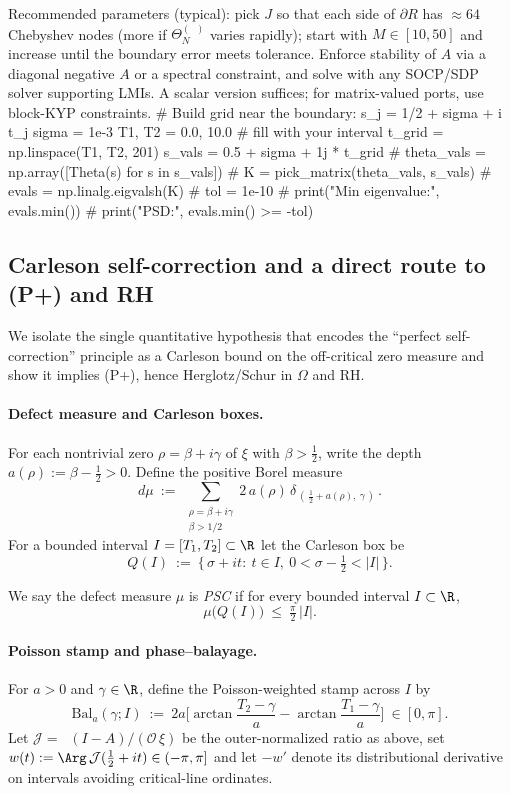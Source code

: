 \documentclass[11pt]{article}
\theoremstyle{remark}
\DeclareMathOperator{\dettwo}{det_2}
\begin{document}
Recommended parameters (typical): pick \(J\) so that each side of \(\partial R\) has \(\approx 64\) Chebyshev nodes (more if \(\Theta_N^{(\dettwo)}\) varies rapidly); start with \(M\in[10,50]\) and increase until the boundary error meets tolerance. Enforce stability of \(A\) via a diagonal negative \(A\) or a spectral constraint, and solve with any SOCP/SDP solver supporting LMIs. A scalar version suffices; for matrix-valued ports, use block-KYP constraints.
# Build grid near the boundary: s_j = 1/2 + sigma + i t_j
sigma = 1e-3
T1, T2 = 0.0, 10.0  # fill with your interval
t_grid = np.linspace(T1, T2, 201)
s_vals = 0.5 + sigma + 1j * t_grid
# theta_vals = np.array([Theta(s) for s in s_vals])
# K = pick_matrix(theta_vals, s_vals)
# evals = np.linalg.eigvalsh(K)
# tol = 1e-10
# print("Min eigenvalue:", evals.min())
# print("PSD:", evals.min() >= -tol)

\subsection{Carleson self-correction and a direct route to (P+) and RH}\label{subsec:PSC}
We isolate the single quantitative hypothesis that encodes the ``perfect self-correction'' principle as a Carleson bound on the off-critical zero measure and show it implies (P+), hence Herglotz/Schur in \(\Omega\) and RH.

\paragraph{Defect measure and Carleson boxes.}
For each nontrivial zero \(\rho=\beta+i\gamma\) of \(\xi\) with \(\beta>\tfrac12\), write the depth \(a(\rho):=\beta-\tfrac12>0\). Define the positive Borel measure
\[
 d\mu\ :=\ \sum_{\substack{\rho=\beta+i\gamma\\ \beta>1/2}} 2\,a(\rho)\,\delta_{\,(\,\tfrac12+a(\rho),\ \gamma\,)}\,.
\]
For a bounded interval \(I=[T_1,T_2]\subset\R\) let the Carleson box be
\[
 Q(I)\ :=\ \{\,\sigma+it:\ t\in I,\ 0<\sigma-\tfrac12<|I|\,\}.
\]

\begin{definition}\label{def:PSC}
We say the defect measure \(\mu\) is \emph{PSC} if for every bounded interval \(I\subset\R\),
\[
 \mu\big(Q(I)\big)\ \le\ \tfrac{\pi}{2}\,|I|.
\]
\end{definition}

\paragraph{Poisson stamp and phase--balayage.}
For \(a>0\) and \(\gamma\in\R\), define the Poisson-weighted stamp across \(I\) by
\[
 \mathrm{Bal}_a(\gamma;I)\ :=\ 2a\Big[\arctan\!\frac{T_2-\gamma}{a}-\arctan\!\frac{T_1-\gamma}{a}\Big]\ \in [0,\pi].
\]
Let \(\mathcal J=\dettwo(I-A)/(\mathcal O\,\xi)\) be the outer-normalized ratio as above, set \(w(t):=\Arg\,\mathcal J(\tfrac12+it)\in(-\pi,\pi] \) and let \(-w'\) denote its distributional derivative on intervals avoiding critical-line ordinates.
\end{document}
